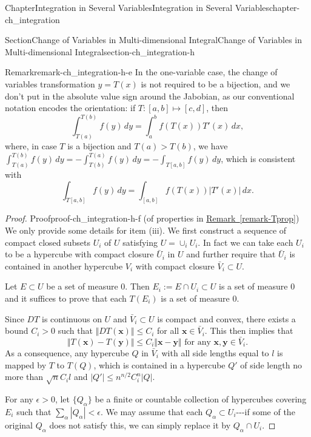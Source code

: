 \documentclass[oneside,10pt,]{book}
\newcommand{\xreffont}{\relax}
\numberwithin{equation}{section}
\newcommand{\bx}{\mathbf{x}}
\newcommand{\by}{\mathbf{y}}
\newcommand{\lt}{<}
\begin{document}
\begin{chapterptx}{Chapter}{Integration in Several Variables}{}{Integration in Several Variables}{}{}{chapter-ch_integration}
\begin{sectionptx}{Section}{Change of Variables in Multi-dimensional Integral}{}{Change of Variables in Multi-dimensional Integral}{}{}{section-ch_integration-h}
\begin{remark}{Remark}{}{remark-ch_integration-h-e}
In the one-variable case, the change of variables transformation \(y=T(x)\) is not required to be a bijection, and we don't put in the absolute value sign around the Jabobian, as our conventional notation encodes the orientation: if \(T: [a, b]\mapsto [c, d]\), then%
\begin{equation*}
\int_{T(a)}^{T(b)} f(y)\, dy = \int_{a}^{b} f(T(x)) T'(x)\, dx,
\end{equation*}
where, in case \(T\) is a bijection and \(T(a)>T(b)\), we have \(\int_{T(a)}^{T(b)} f(y)\, dy
=- \int_{T(b)}^{T(a)} f(y)\, dy=-\int_{T[a, b]} f(y)\, dy\), which is consistent with%
\begin{equation*}
\int_{T[a, b]} f(y)\, dy = \int_{[a, b]} f(T(x)) |T'(x)|\, dx.
\end{equation*}
\end{remark}
\begin{proof}{Proof}{}{proof-ch_integration-h-f}
(of properties in \hyperref[remark-Tprop]{Remark~{\xreffont\ref{remark-Tprop}}}) We only provide some details for item (iii). We first construct a sequence of compact closed subsets \(U_{i}\) of \(U\) satisfying  \(U=\cup_{i} U_{i}\). In fact we can take each \(U_{i}\) to be a hypercube with compact closure \(\bar U_{i}\) in \(U\) and further require that \(\bar U_{i}\) is contained in another hypercube \(V_{i}\) with compact closure \(\bar V_{i}\subset U\).%
\par
Let \(E\subset U\) be a set of measure \(0\). Then \(E_{i} :=E\cap U_{i}\subset U\)  is a set of measure \(0\) and it suffices to prove that each \(T(E_{i})\) is a set of measure \(0\).%
\par
Since \(DT\) is continuous on \(U\) and \(\bar V_{i}\subset U\) is compact and convex, there exists a bound \(C_{i}>0\) such that \(\Vert DT(\bx)\Vert \le C_{i}\) for all \(\bx \in \bar V_{i}\). This then implies that%
\begin{equation*}
\Vert T(\bx)-T(\by)\Vert \le C_{i} \Vert \bx -\by \Vert \text{ for any $\bx, \by\in \bar V_{i}$.}
\end{equation*}
As a consequence, any hypercube \(Q\) in \(\bar V_{i} \) with all side lengths equal to \(l\)  is mapped by \(T\) to \(T(Q)\), which is contained in a hypercube \(Q'\) of side length no more than \(\sqrt n C_{i }l\) and \(|Q'|\le n^{n/2}C_{i}^{n} |Q|\).%
\par
For  any \(\epsilon >0\), let \(\{Q_{\alpha}\}\) be a finite or countable collection of hypercubes covering \(E_{i}\) such that \(\sum_{\alpha} |Q_{\alpha}| \lt \epsilon\). We may assume that each \(Q_{\alpha}\subset U_{i}\)-{}-{}-if some of the original \(Q_{\alpha}\) does not satisfy this, we can simply replace it by \(Q_{\alpha}\cap U_{i}\).%

\end{proof}
\end{sectionptx}
\end{chapterptx}
\end{document}
